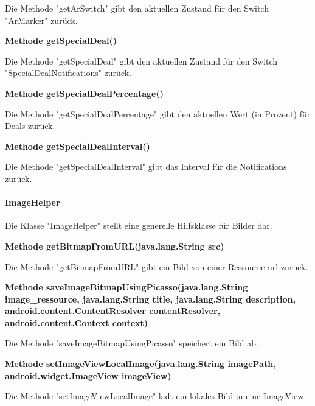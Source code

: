 \documentclass{scrartcl}
\begin{document}
\noindent Die Methode "getArSwitch" gibt den aktuellen Zustand für den Switch "ArMarker" zurück. \newline 

\noindent\textbf{Methode getSpecialDeal()}

\noindent Die Methode "getSpecialDeal" gibt den aktuellen Zustand für den Switch "SpecialDealNotifications" zurück. \newline 

\noindent\textbf{Methode getSpecialDealPercentage()}

\noindent Die Methode "getSpecialDealPercentage" gibt den aktuellen Wert (in Prozent) für Deals zurück. \newline 

\noindent\textbf{Methode getSpecialDealInterval()}

\noindent Die Methode "getSpecialDealInterval" gibt das Interval für die Notifications zurück. \newline 


\paragraph{ImageHelper}
Die Klasse "ImageHelper" stellt eine generelle Hilfsklasse für Bilder dar. \newline 

\noindent\textbf{Methode getBitmapFromURL(java.lang.String src)}

\noindent Die Methode "getBitmapFromURL" gibt ein Bild von einer Ressource url zurück. \newline 

\noindent\textbf{Methode saveImageBitmapUsingPicasso(java.lang.String image\_ressource, \newline 
java.lang.String title,
java.lang.String description, \newline 
android.content.ContentResolver contentResolver, \newline 
android.content.Context context)}

\noindent Die Methode "saveImageBitmapUsingPicasso" speichert ein Bild ab. \newline 

\noindent\textbf{Methode setImageViewLocalImage(java.lang.String imagePath, \newline android.widget.ImageView imageView)}

\noindent Die Methode "setImageViewLocalImage" lädt ein lokales Bild in eine ImageView. \newline 
\end{document}

